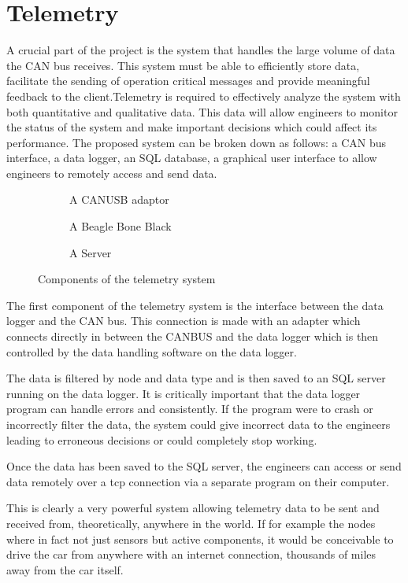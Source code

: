 \documentclass[10pt,a4paper]{article}
\begin{document}
\section{Telemetry}
A crucial part of the project is the system that handles the large volume of data the CAN bus receives. This system must be able to efficiently store data, facilitate the sending of operation critical messages and provide meaningful feedback to the client.Telemetry is required to effectively analyze the system with both quantitative and qualitative data. This data will allow engineers to monitor the status of the system and make important decisions which could affect its performance. The proposed system can be broken down as follows: a CAN bus interface, a data logger, an SQL database, a graphical user interface to allow engineers to remotely access and send data.
\begin{figure}
         \centering
         \begin{subfigure}[b]{0.6\textwidth}
                 \caption{A CANUSB adaptor}
                 \label{fig:CANUSB adaptor}
         \end{subfigure}

         \begin{subfigure}[b]{0.4\textwidth}
                 \caption{A Beagle Bone Black}
                 \label{fig:Beable Bone Black}
         \end{subfigure}

         \begin{subfigure}[b]{0.5\textwidth}
                 \caption{A Server}
                 \label{fig:Sever}
         \end{subfigure}
         \caption{Components of the telemetry system}\label{fig:telemetry}
\end{figure}
The first component of the telemetry system is the interface between the data logger and the CAN bus. This connection is made with an adapter which connects directly in between the CANBUS and the data logger which is then controlled by the data handling software on the data logger.

The data is filtered by node and data type and is then saved to an SQL server running on the data logger. It is critically important that the data logger program can handle errors and consistently. If the program were to crash or incorrectly filter the data, the system could give incorrect data to the engineers leading to erroneous decisions or could completely stop working.

Once the data has been saved to the SQL server, the engineers can access or send data remotely over a tcp connection via a separate program on their computer.

This is clearly a very powerful system allowing telemetry data to be sent and received from, theoretically,  anywhere in the world. If for example the nodes where in fact not just sensors but active components, it would be conceivable to drive the car from anywhere with an internet connection, thousands of miles away from the car itself.
\end{document}
